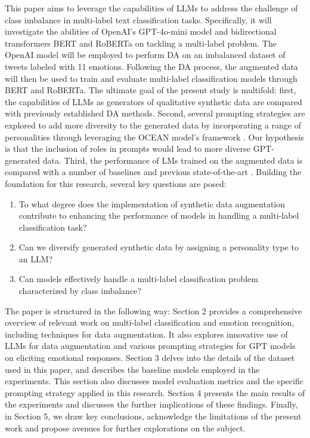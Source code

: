 \documentclass[manuscript]{clv3}
\begin{document}
This paper aims to leverage the capabilities of LLMs to address the challenge of class imbalance in multi-label text classification tasks. Specifically, it will investigate the abilities of OpenAI's GPT-4o-mini model and bidirectional transformers BERT and RoBERTa on tackling a multi-label problem. The OpenAI model will be employed to perform DA on an imbalanced dataset of tweets labeled with 11 emotions. Following the DA process, the augmented data will then be used to train and evaluate multi-label classification models through BERT and RoBERTa. The ultimate goal of the present study is multifold: first, the capabilities of LLMs as generators of qualitative synthetic data are compared with previously established DA methods. Second, several prompting strategies are explored to add more diversity to the generated data by incorporating a range of personalities through leveraging the OCEAN model's framework \cite{article}. Our hypothesis is that the inclusion of roles in prompts would lead to more diverse GPT-generated data. Third, the performance of LMs trained on the augmented data is compared with a number of baselines and previous state-of-the-art \cite{10.1016/j.eswa.2022.118534}. 
Building the foundation for this research, several key questions are posed:
\begin{enumerate}
    \item To what degree does the implementation of synthetic data augmentation contribute to enhancing the performance of models in handling a multi-label classification task?
    \item  Can we diversify generated synthetic data by assigning a personality type to an LLM?
    \item Can models effectively handle a multi-label classification problem characterized by class imbalance?
\end{enumerate}

The paper is structured in the following way: Section 2 provides a comprehensive overview of relevant work on multi-label classification and emotion recognition, including techniques for data augmentation. It also explores innovative use of LLMs for data augmentation and various prompting strategies for GPT models on eliciting emotional responses. Section 3 delves into the details of the dataset used in this paper, and describes the baseline models employed in the experiments. This section also discusses model evaluation metrics and the specific prompting strategy applied in this research. Section 4 presents the main results of the experiments and discusses the further implications of these findings. Finally, in Section 5, we draw key conclusions, acknowledge the limitations of the present work and propose avenues for further explorations on the subject.
\end{document}
